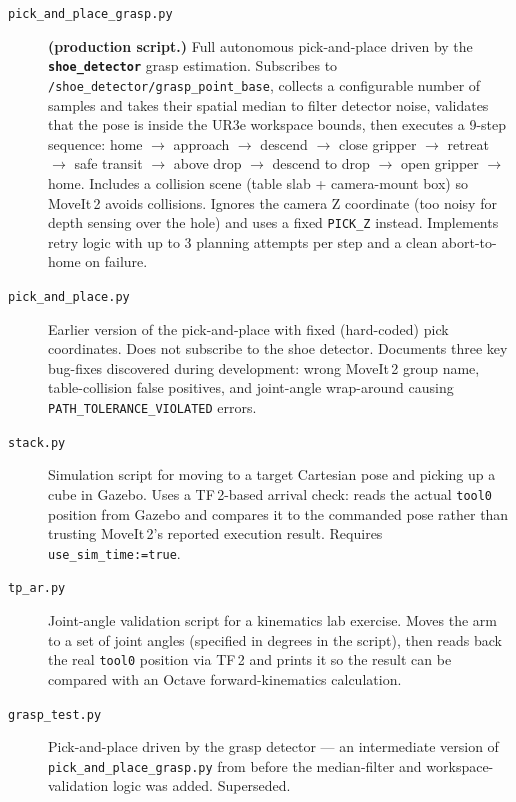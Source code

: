 \documentclass[11pt,a4paper]{article}
\newcommand{\pkg}[1]{\texttt{\textbf{#1}}}
\newcommand{\file}[1]{\texttt{#1}}
\newcommand{\topic}[1]{\texttt{\small #1}}
\begin{document}
\begin{description}

  \item[\file{pick\_and\_place\_grasp.py}]
    \textbf{(production script.)}
    Full autonomous pick-and-place driven by the \pkg{shoe\_detector}
    grasp estimation. Subscribes to \topic{/shoe\_detector/grasp\_point\_base},
    collects a configurable number of samples and takes their spatial median
    to filter detector noise, validates that the pose is inside the UR3e
    workspace bounds, then executes a 9-step sequence:
    home $\to$ approach $\to$ descend $\to$ close gripper $\to$ retreat
    $\to$ safe transit $\to$ above drop $\to$ descend to drop $\to$
    open gripper $\to$ home.
    Includes a collision scene (table slab + camera-mount box) so MoveIt\,2
    avoids collisions. Ignores the camera Z coordinate (too noisy for depth
    sensing over the hole) and uses a fixed \texttt{PICK\_Z} instead.
    Implements retry logic with up to 3 planning attempts per step and a
    clean abort-to-home on failure.

  \item[\file{pick\_and\_place.py}]
    Earlier version of the pick-and-place with fixed (hard-coded) pick
    coordinates. Does not subscribe to the shoe detector. Documents three
    key bug-fixes discovered during development: wrong MoveIt\,2 group name,
    table-collision false positives, and joint-angle wrap-around causing
    \texttt{PATH\_TOLERANCE\_VIOLATED} errors.

  \item[\file{stack.py}]
    Simulation script for moving to a target Cartesian pose and picking up
    a cube in Gazebo. Uses a TF\,2-based arrival check: reads the actual
    \texttt{tool0} position from Gazebo and compares it to the commanded pose
    rather than trusting MoveIt\,2's reported execution result. Requires
    \texttt{use\_sim\_time:=true}.

  \item[\file{tp\_ar.py}]
    Joint-angle validation script for a kinematics lab exercise. Moves the
    arm to a set of joint angles (specified in degrees in the script), then
    reads back the real \texttt{tool0} position via TF\,2 and prints it so
    the result can be compared with an Octave forward-kinematics calculation.

  \item[\file{grasp\_test.py}]
    Pick-and-place driven by the grasp detector --- an intermediate version
    of \file{pick\_and\_place\_grasp.py} from before the median-filter and
    workspace-validation logic was added. Superseded.


\end{description}
\end{document}
